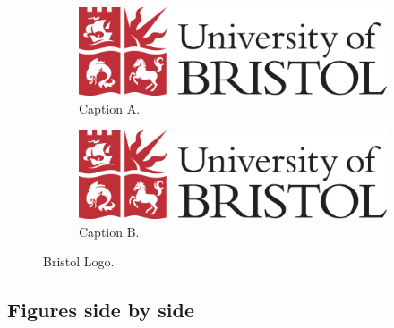 \begin{figure}[h]
    \centering
    \begin{subfigure}[h]{0.45\textwidth}
        \centering
        \includegraphics[width=\textwidth]{images/Logo - colour PNG.png}
        \caption{Caption A.}
        \label{fig:captiona}
    \end{subfigure}
    \hfill
    \begin{subfigure}[h]{0.45\textwidth}
        \centering
        \includegraphics[width=\textwidth]{images/Logo - colour PNG.png}
        \caption{Caption B.}
        \label{fig:captionb}
    \end{subfigure}
    \caption{Bristol Logo.}
\end{figure}

\subsection{Figures side by side}

